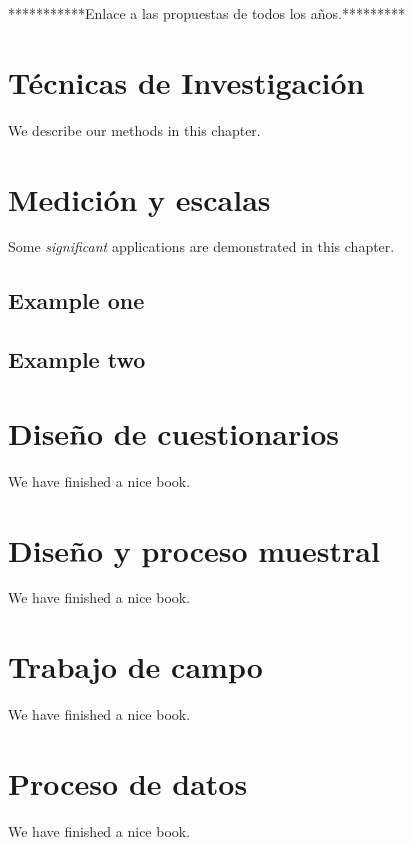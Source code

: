 \documentclass[
]{book}
\begin{document}
***********Enlace a las propuestas de todos los años.*********

\hypertarget{tema03}{%
\chapter{Técnicas de Investigación}\label{tema03}}

We describe our methods in this chapter.

\hypertarget{tema04}{%
\chapter{Medición y escalas}\label{tema04}}

Some \emph{significant} applications are demonstrated in this chapter.

\hypertarget{example-one}{%
\section{Example one}\label{example-one}}

\hypertarget{example-two}{%
\section{Example two}\label{example-two}}

\hypertarget{tema05}{%
\chapter{Diseño de cuestionarios}\label{tema05}}

We have finished a nice book.

\hypertarget{tema06}{%
\chapter{Diseño y proceso muestral}\label{tema06}}

We have finished a nice book.

\hypertarget{tema07}{%
\chapter{Trabajo de campo}\label{tema07}}

We have finished a nice book.

\hypertarget{tema08}{%
\chapter{Proceso de datos}\label{tema08}}

We have finished a nice book.

  
\end{document}
